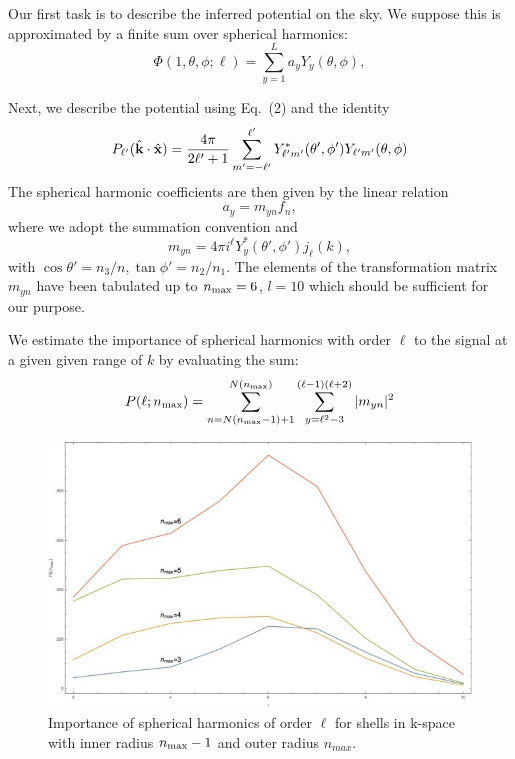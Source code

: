\documentclass[12pt]{article}
\begin{document}
Our first task is to describe the inferred potential on the sky. We suppose this is approximated by a finite sum over spherical harmonics:
\begin{equation}
\Phi(1,\theta,\phi;\ell)=\sum_{y=1}^La_yY_y(\theta,\phi),
\end{equation}

Next, we describe the potential using Eq.~(2) and the identity
\begin{equation}
P_{\ell'}(\hat{\bf k}\cdot\hat{\bf x})=\frac{4\pi}{2\ell'+1}\sum_{m'=-\ell'}^{\ell'}Y_{\ell'm'}^\ast(\theta',\phi')Y_{\ell'm'}(\theta,\phi)
\end{equation}
The spherical harmonic coefficients are then given by the linear relation
\begin{equation}
a_y=m_{yn}f_n,
\end{equation}
where we adopt the summation convention and 
\begin{equation}
m_{yn}=4\pi i^\ell Y_y^\ast(\theta',\phi')j_\ell(k),
\end{equation}
with $\cos\theta'=n_3/n,\tan\phi'=n_2/n_1$. The elements of the transformation matrix $m_{yn}$ have been tabulated up to $n_{\rm max}=6$, $l=10$ which should be sufficient for our purpose. 

We estimate the importance of spherical harmonics with order $\ell$ to the signal at a given given range of $k$ by evaluating the sum:
\begin{equation}
P(\ell;n_{\rm max})=\sum_{n=N(n_{\rm max}-1)+1}^{N(n_{\rm max})}\sum_{y=\ell^2-3}^{(\ell-1)(\ell+2)}|m_{yn}|^2
\end{equation} 
\begin{figure}[h!]
\centering
\includegraphics[width=6in]{fig6.jpg} 
\caption{Importance of spherical harmonics of order $\ell$ for shells in k-space with inner radius $n_{\rm max}-1$ and outer radius $n_{max}$.}
\end{figure}
   
\end{document}
